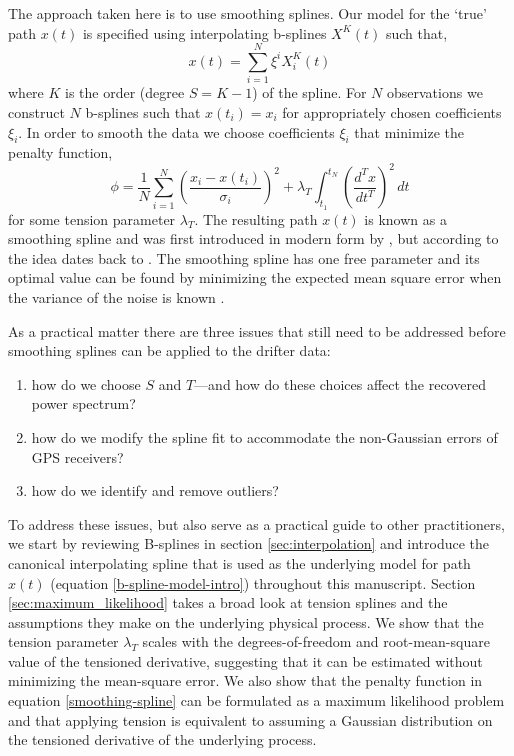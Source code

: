\documentclass[10pt,journal]{IEEEtran}
\begin{document}
The approach taken here is to use smoothing splines. Our model for the `true' path $x(t)$ is specified using interpolating b-splines $X^K(t)$ such that,
\begin{equation}
\label{b-spline-model-intro}
    x(t) = \sum_{i=1}^N \xi^i X^K_i(t)
\end{equation}
where $K$ is the order (degree $S=K-1$) of the spline. For $N$ observations we construct $N$ b-splines such that $x(t_i)=x_i$ for appropriately chosen coefficients $\xi_i$. In order to smooth the data we choose coefficients $\xi_i$ that minimize the penalty function,
\begin{equation}
\label{smoothing-spline}
\phi =  \frac{1}{N}\sum_{i=1}^{N} \left( \frac{x_i - x(t_i)}{\sigma_i} \right) ^2 + \lambda_T \int_{t_1}^{t_N} \left(\frac{d^T x}{dt^T}\right)^2 \, dt
\end{equation}
for some tension parameter $\lambda_T$. The resulting path $x(t)$ is known as a smoothing spline and was first introduced in modern form by \cite{reinsch1967-nm}, but according to \cite{deboor1978-book} the idea dates back to \cite{whittaker1923-pems}. The smoothing spline has one free parameter and its optimal value can be found by minimizing the expected mean square error when the variance of the noise is known \cite{craven1979-nm}.

As a practical matter there are three issues that still need to be addressed before smoothing splines can be applied to the drifter data:
\begin{enumerate}
    \item how do we choose $S$ and $T$---and how do these choices affect the recovered power spectrum?
    \item how do we modify the spline fit to accommodate the non-Gaussian errors of GPS receivers?
    \item how do we identify and remove outliers?
\end{enumerate}
To address these issues, but also serve as a practical guide to other practitioners, we start by reviewing B-splines in section \ref{sec:interpolation} and introduce the canonical interpolating spline that is used as the underlying model for path $x(t)$ (equation \ref{b-spline-model-intro}) throughout this manuscript. Section \ref{sec:maximum_likelihood} takes a broad look at tension splines and the assumptions they make on the underlying physical process. We show that the tension parameter $\lambda_T$ scales with the degrees-of-freedom and root-mean-square value of the tensioned derivative, suggesting that it can be estimated without minimizing the mean-square error. We also show that the penalty function in equation \ref{smoothing-spline} can be formulated as a maximum likelihood problem and that applying tension is equivalent to assuming a Gaussian distribution on the tensioned derivative of the underlying process.
\end{document}
